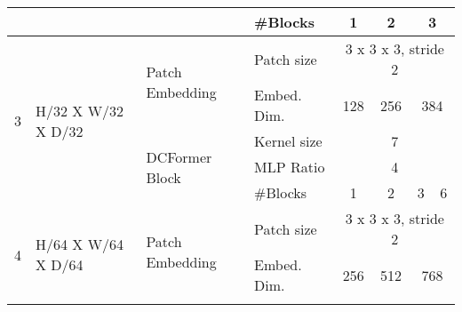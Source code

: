 \begin{table*}[t]
\begin{center}
\begin{tabular}{|llll|cccc|}
\multicolumn{1}{|l|}{}                       & \multicolumn{1}{l|}{}                                    & \multicolumn{1}{l|}{}                                    & \#Blocks                    & \multicolumn{1}{c|}{1}     & \multicolumn{1}{c|}{2}     & \multicolumn{2}{c|}{3}             \\ \hline
\multicolumn{1}{|l|}{\multirow{5}{*}{3}}     & \multicolumn{1}{l|}{\multirow{5}{*}{H/32 X W/32 X D/32}} & \multicolumn{1}{l|}{\multirow{2}{*}{Patch Embedding}}    & Patch size                 & \multicolumn{4}{c|}{3 x 3 x 3, stride 2}                                                     \\ \cline{4-8} 
\multicolumn{1}{|l|}{}                       & \multicolumn{1}{l|}{}                                    & \multicolumn{1}{l|}{}                                    & Embed. Dim.                & \multicolumn{1}{c|}{128}   & \multicolumn{1}{c|}{256}   & \multicolumn{2}{c|}{384}           \\ \cline{3-8} 
\multicolumn{1}{|l|}{}                       & \multicolumn{1}{l|}{}                                    & \multicolumn{1}{l|}{\multirow{3}{*}{DCFormer Block}} & Kernel size                & \multicolumn{4}{c|}{7}                                                                       \\ \cline{4-8} 
\multicolumn{1}{|l|}{}                       & \multicolumn{1}{l|}{}                                    & \multicolumn{1}{l|}{}                                    & MLP Ratio                  & \multicolumn{4}{c|}{4}                                                                       \\ \cline{4-8} 
\multicolumn{1}{|l|}{}                       & \multicolumn{1}{l|}{}                                    & \multicolumn{1}{l|}{}                                    & \#Blocks                    & \multicolumn{1}{c|}{1}     & \multicolumn{1}{c|}{2}     & \multicolumn{1}{c|}{3}     & 6     \\ \hline
\multicolumn{1}{|l|}{\multirow{5}{*}{4}}     & \multicolumn{1}{l|}{\multirow{5}{*}{H/64 X W/64 X D/64}} & \multicolumn{1}{l|}{\multirow{2}{*}{Patch Embedding}}    & Patch size                 & \multicolumn{4}{c|}{3 x 3 x 3, stride 2}                                                     \\ \cline{4-8} 
\multicolumn{1}{|l|}{}                       & \multicolumn{1}{l|}{}                                    & \multicolumn{1}{l|}{}                                    & Embed. Dim.                & \multicolumn{1}{c|}{256}   & \multicolumn{1}{c|}{512}   & \multicolumn{2}{c|}{768}           \\ \cline{3-8} 

\end{tabular}
\end{center}
\end{table*}
